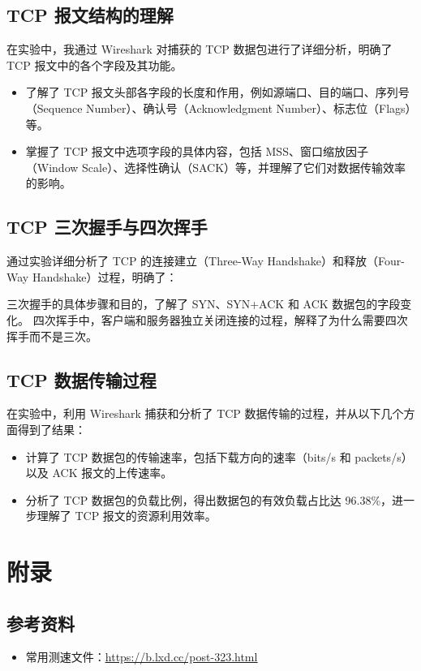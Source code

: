 \documentclass[14pt,a4paper,UTF8,twoside]{article}
\begin{document}
\subsection{TCP 报文结构的理解}

在实验中，我通过 Wireshark 对捕获的 TCP 数据包进行了详细分析，明确了 TCP 报文中的各个字段及其功能。

\begin{itemize}
	\item 了解了 TCP 报文头部各字段的长度和作用，例如源端口、目的端口、序列号（Sequence Number）、确认号（Acknowledgment Number）、标志位（Flags）等。
	\item 掌握了 TCP 报文中选项字段的具体内容，包括 MSS、窗口缩放因子（Window Scale）、选择性确认（SACK）等，并理解了它们对数据传输效率的影响。
\end{itemize}

\subsection{TCP 三次握手与四次挥手}

通过实验详细分析了 TCP 的连接建立（Three-Way Handshake）和释放（Four-Way Handshake）过程，明确了：

三次握手的具体步骤和目的，了解了 SYN、SYN+ACK 和 ACK 数据包的字段变化。
四次挥手中，客户端和服务器独立关闭连接的过程，解释了为什么需要四次挥手而不是三次。

\subsection{TCP 数据传输过程}

在实验中，利用 Wireshark 捕获和分析了 TCP 数据传输的过程，并从以下几个方面得到了结果：

\begin{itemize}
	\item 计算了 TCP 数据包的传输速率，包括下载方向的速率（bits/s 和 packets/s）以及 ACK 报文的上传速率。
	\item 分析了 TCP 数据包的负载比例，得出数据包的有效负载占比达 96.38\%，进一步理解了 TCP 报文的资源利用效率。
\end{itemize}

\section{附录}

\subsection*{参考资料}

\begin{itemize}
    \item 常用测速文件：\href{https://b.lxd.cc/post-323.html}{\underline{https://b.lxd.cc/post-323.html}}
\end{itemize}
\end{document}
